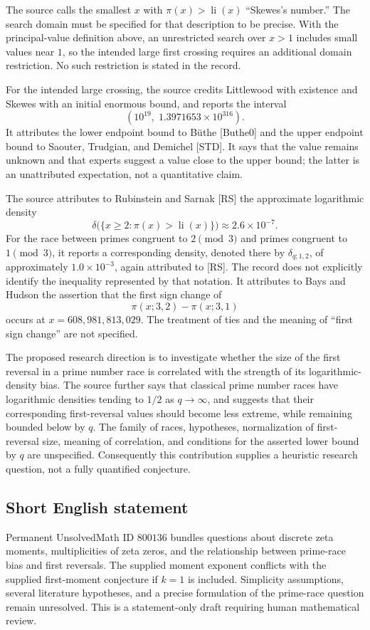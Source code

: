 \documentclass[11pt]{article}
\begin{document}
The source calls the smallest \(x\) with \(\pi(x)>\operatorname{li}(x)\) ``Skewes's number.'' The search domain must be specified for that description to be precise. With the principal-value definition above, an unrestricted search over \(x>1\) includes small values near \(1\), so the intended large first crossing requires an additional domain restriction. No such restriction is stated in the record.

For the intended large crossing, the source credits Littlewood with existence and Skewes with an initial enormous bound, and reports the interval
\[
\left(10^{19},\;1.3971653\times10^{316}\right).
\]
It attributes the lower endpoint bound to B\"uthe [Buthe0] and the upper endpoint bound to Saouter, Trudgian, and Demichel [STD]. It says that the value remains unknown and that experts suggest a value close to the upper bound; the latter is an unattributed expectation, not a quantitative claim.

The source attributes to Rubinstein and Sarnak [RS] the approximate logarithmic density
\[
\delta\bigl(\{x\geq2:\pi(x)>\operatorname{li}(x)\}\bigr)
\approx2.6\times10^{-7}.
\]
For the race between primes congruent to \(2\pmod3\) and primes congruent to \(1\pmod3\), it reports a corresponding density, denoted there by \(\delta_{q;1,2}\), of approximately \(1.0\times10^{-3}\), again attributed to [RS]. The record does not explicitly identify the inequality represented by that notation. It attributes to Bays and Hudson the assertion that the first sign change of
\[
\pi(x;3,2)-\pi(x;3,1)
\]
occurs at \(x=608{,}981{,}813{,}029\). The treatment of ties and the meaning of ``first sign change'' are not specified.

The proposed research direction is to investigate whether the size of the first reversal in a prime number race is correlated with the strength of its logarithmic-density bias. The source further says that classical prime number races have logarithmic densities tending to \(1/2\) as \(q\to\infty\), and suggests that their corresponding first-reversal values should become less extreme, while remaining bounded below by \(q\). The family of races, hypotheses, normalization of first-reversal size, meaning of correlation, and conditions for the asserted lower bound by \(q\) are unspecified. Consequently this contribution supplies a heuristic research question, not a fully quantified conjecture.
\subsection{Short English statement}
Permanent UnsolvedMath ID \(800136\) bundles questions about discrete zeta moments, multiplicities of zeta zeros, and the relationship between prime-race bias and first reversals. The supplied moment exponent conflicts with the supplied first-moment conjecture if \(k=1\) is included. Simplicity assumptions, several literature hypotheses, and a precise formulation of the prime-race question remain unresolved. This is a statement-only draft requiring human mathematical review.
\end{document}
